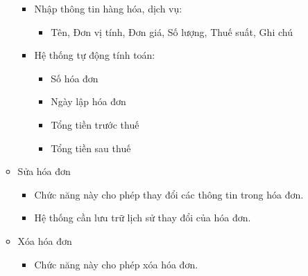 \begin{itemize}
\begin{itemize}
\begin{itemize}
\begin{itemize}
\end{itemize}

\item Nhập thông tin hàng hóa, dịch vụ:

\begin{itemize}

\item Tên, Đơn vị tính, Đơn giá, Số lượng, Thuế suất, Ghi chú

\end{itemize}

\item Hệ thống tự động tính toán:

\begin{itemize}

\item Số hóa đơn

\item Ngày lập hóa đơn

\item Tổng tiền trước thuế

\item Tổng tiền sau thuế

\end{itemize}

\end{itemize}

\item Sửa hóa đơn

\begin{itemize}

\item Chức năng này cho phép thay đổi các thông tin trong hóa đơn.

\item Hệ thống cần lưu trữ lịch sử thay đổi của hóa đơn.

\end{itemize}




\item Xóa hóa đơn

\begin{itemize}

\item Chức năng này cho phép xóa hóa đơn.

\end{itemize}


\end{itemize}
\end{itemize}
